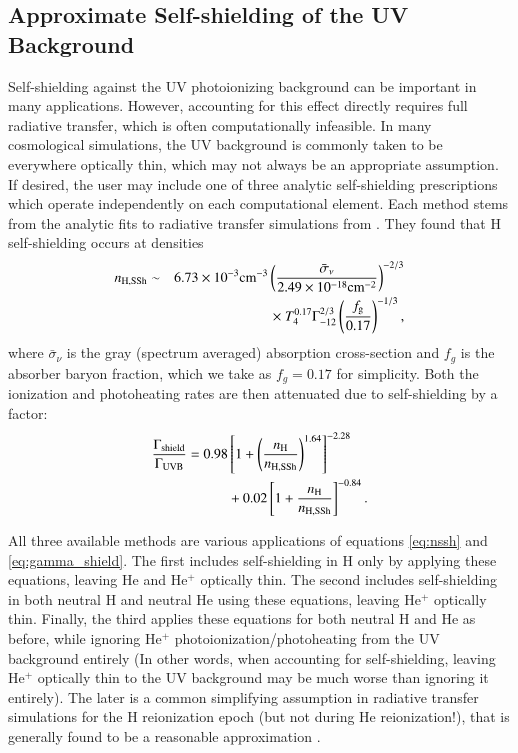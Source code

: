 \subsection{Approximate Self-shielding of the UV Background}
\label{section:UVB-self-shielding}
Self-shielding against the UV photoionizing background can be important in many applications. However, accounting for this effect directly requires full radiative transfer, which is often computationally infeasible. In many cosmological simulations, the UV background is commonly taken to be everywhere optically thin, which may not always be an appropriate assumption. If desired, the user may include one of three analytic self-shielding prescriptions which operate independently on each computational element. Each method stems from the analytic fits to radiative transfer simulations from \citet{2013MNRAS.430.2427R}. They found that H self-shielding occurs at densities
\begin{eqnarray} \label{eq:nssh}
n_{\rm{H,SSh}} & \sim & 6.73\times10^{-3} \rm{cm}^{-3} \left(\frac{\bar{\sigma}_{\nu}}{2.49\times10^{-18} \rm{cm}^{-2}}\right)^{-2/3} \nonumber \\
 & & \times ~ T_{4}^{0.17} \Gamma_{-12}^{2/3} \left(\frac{f_{\rm{g}}}{0.17}\right)^{-1/3},
\end{eqnarray}
where $\bar{\sigma}_{\nu}$ is the gray (spectrum averaged) absorption cross-section and $f_g$ is the absorber baryon fraction, which we take as $f_g = 0.17$ for simplicity. Both the ionization and photoheating rates are then attenuated due to self-shielding by a factor:
\begin{eqnarray} \label{eq:gamma_shield}
\frac{\Gamma_{\rm{shield}}}{\Gamma_{\rm{UVB}}} = 0.98 & \left[ 1 + \left(\frac{n_{\rm{H}}}{n_{\rm{H,SSh}}}\right)^{1.64}\right]^{-2.28} \nonumber \\
 & + 0.02 \left[ 1 + \frac{n_{\rm{H}}}{n_{\rm{H,SSh}}}\right]^{-0.84}.
\end{eqnarray}

All three available methods are various applications of equations \ref{eq:nssh} and \ref{eq:gamma_shield}. The first includes self-shielding in H only by applying these equations, leaving He and He$^+$ optically thin. The second includes self-shielding in both neutral H and neutral He using these equations, leaving He$^+$ optically thin. Finally, the third applies these equations for both neutral H and He as before, while ignoring He$^+$ photoionization/photoheating from the UV background entirely (In other words, when accounting for self-shielding, leaving He$^+$ optically thin to the UV background may be much worse than ignoring it entirely). The later is a common simplifying assumption in radiative transfer simulations for the H reionization epoch (but not during He reionization!), that is generally found to be a reasonable approximation \citep{2006agna.book.....O, 2010MNRAS.408.1945M, 2012MNRAS.421.2232F, 2013MNRAS.430.2427R}.  

